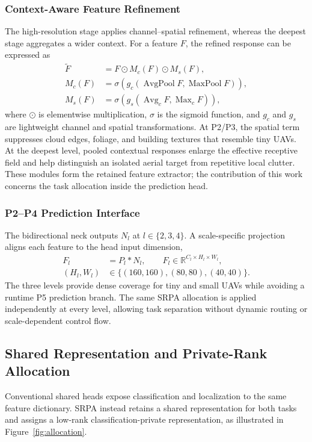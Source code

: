 \subsubsection{Context-Aware Feature Refinement}
The high-resolution stage applies channel--spatial refinement, whereas the deepest stage aggregates a wider context. For a feature $F$, the refined response can be expressed as
\begin{equation}
\begin{aligned}
\widetilde{F}&=F\odot M_c(F)\odot M_s(F),\\
M_c(F)&=\sigma\!\left(g_c(\operatorname{AvgPool}F,\operatorname{MaxPool}F)\right),\\
M_s(F)&=\sigma\!\left(g_s(\operatorname{Avg}_cF,\operatorname{Max}_cF)\right),
\end{aligned}
\label{eq:refinement}
\end{equation}
where $\odot$ is elementwise multiplication, $\sigma$ is the sigmoid function, and $g_c$ and $g_s$ are lightweight channel and spatial transformations. At P2/P3, the spatial term suppresses cloud edges, foliage, and building textures that resemble tiny UAVs. At the deepest level, pooled contextual responses enlarge the effective receptive field and help distinguish an isolated aerial target from repetitive local clutter. These modules form the retained feature extractor; the contribution of this work concerns the task allocation inside the prediction head.

\subsubsection{P2--P4 Prediction Interface}
The bidirectional neck outputs $N_l$ at $l\in\{2,3,4\}$. A scale-specific projection aligns each feature to the head input dimension,
\begin{equation}
\begin{aligned}
F_l&=P_l*N_l,\qquad F_l\in\mathbb{R}^{C_l\times H_l\times W_l},\\
(H_l,W_l)&\in\{(160,160),(80,80),(40,40)\}.
\end{aligned}
\label{eq:headinput}
\end{equation}
The three levels provide dense coverage for tiny and small UAVs while avoiding a runtime P5 prediction branch. The same SRPA allocation is applied independently at every level, allowing task separation without dynamic routing or scale-dependent control flow.

\subsection{Shared Representation and Private-Rank Allocation}
Conventional shared heads expose classification and localization to the same feature dictionary. SRPA instead retains a shared representation for both tasks and assigns a low-rank classification-private representation, as illustrated in Figure~\ref{fig:allocation}.

